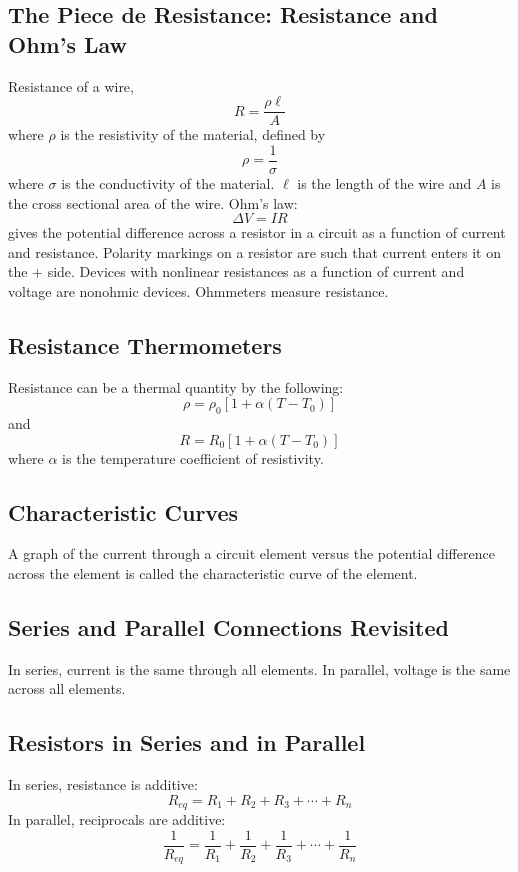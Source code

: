 \documentclass[twocolumn]{article}
\begin{document}
\subsection{The Piece de Resistance: Resistance and Ohm's Law}
\begin{outline}
	\1 Resistance of a wire, \[R=\dfrac{\rho\ell}{A}\] where $\rho$ is the resistivity of the material, defined by \[\rho=\dfrac{1}{\sigma}\] where $\sigma$ is the conductivity of the material. $\ell$ is the length of the wire and $A$ is the cross sectional area of the wire. 
	\1 Ohm's law: \[\Delta V=IR\] gives the potential difference across a resistor in a circuit as a function of current and resistance. 
	\1 Polarity markings on a resistor are such that current enters it on the + side.
	\1 Devices with nonlinear resistances as a function of current and voltage are nonohmic devices. 
	\1 Ohmmeters measure resistance.
\end{outline}
\subsection{Resistance Thermometers}
\begin{outline}
	\1 Resistance can be a thermal quantity by the following: \[\rho=\rho_0[1+\alpha(T-T_0)]\] and \[R=R_0[1+\alpha(T-T_0)]\] where $\alpha$ is the temperature coefficient of resistivity. 

\end{outline}
\subsection{Characteristic Curves}
\begin{outline}
	\1 A graph of the current through a circuit element versus the potential difference across the element is called the characteristic curve of the element. 
\end{outline}
\subsection{Series and Parallel Connections Revisited}
\begin{outline}
	\1 In series, current is the same through all elements.
	\1 In parallel, voltage is the same across all elements. 

\end{outline}
\subsection{Resistors in Series and in Parallel}
\begin{outline}
	\1 In series, resistance is additive: \[R_{eq}=R_1+R_2+R_3+\cdots+R_n\]
	\1 In parallel, reciprocals are additive: \[\dfrac{1}{R_{eq}}=\dfrac{1}{R_1}+\dfrac{1}{R_2}+\dfrac{1}{R_3}+\cdots+\dfrac{1}{R_n}\]

\end{outline}
\end{document}
